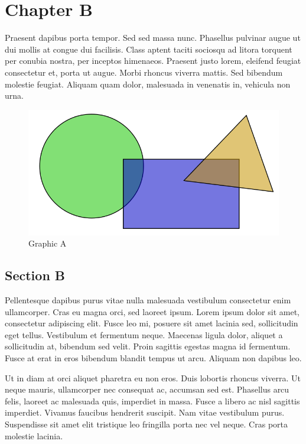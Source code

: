 \chapter{Chapter B}
Praesent dapibus porta tempor. Sed sed massa nunc. Phasellus pulvinar augue ut dui mollis at congue dui facilisis. Class aptent taciti sociosqu ad litora torquent per conubia nostra, per inceptos himenaeos. Praesent justo lorem, eleifend feugiat consectetur et, porta ut augue. Morbi rhoncus viverra mattis. Sed bibendum molestie feugiat. Aliquam quam dolor, malesuada in venenatis in, vehicula non urna.

\begin{figure}[h]
\begin{centering}
    \includegraphics[scale=1]{../fig/a}
    \caption{Graphic A}
\end{centering}
\end{figure}

\section{Section B}
Pellentesque dapibus purus vitae nulla malesuada vestibulum consectetur enim ullamcorper. Cras eu magna orci, sed laoreet ipsum. Lorem ipsum dolor sit amet, consectetur adipiscing elit. Fusce leo mi, posuere sit amet lacinia sed, sollicitudin eget tellus. Vestibulum et fermentum neque. Maecenas ligula dolor, aliquet a sollicitudin at, bibendum sed velit. Proin sagittis egestas magna id fermentum. Fusce at erat in eros bibendum blandit tempus ut arcu. Aliquam non dapibus leo.

Ut in diam at orci aliquet pharetra eu non eros. Duis lobortis rhoncus viverra. Ut neque mauris, ullamcorper nec consequat ac, accumsan sed est. Phasellus arcu felis, laoreet ac malesuada quis, imperdiet in massa. Fusce a libero ac nisl sagittis imperdiet. Vivamus faucibus hendrerit suscipit. Nam vitae vestibulum purus. Suspendisse sit amet elit tristique leo fringilla porta nec vel neque. Cras porta molestie lacinia.

